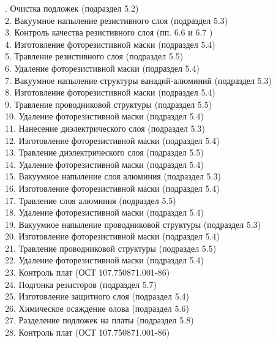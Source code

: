 \documentclass{bmstu}
\begin{document}
. Очистка подложек (подраздел 5.2) \\
	2. Вакуумное напыление резистивного слоя (подраздел 5.3) \\
	3. Контроль качества резистивного слоя (пп. 6.6 и 6.7 ) \\
	4. Изготовление фоторезистивной маски (подраздел 5.4) \\
	5. Травление резистивного слоя (подраздел 5.5) \\
	6. Удаление фоторезистивной маски (подраздел 5.4) \\
	7. Вакуумное напыление структуры ванадий-алюминий  (подраздел 5.3) \\
	8. Изготовление фоторезистивной маски (подраздел 5.4) \\
	9. Травление проводниковой структуры (подраздел 5.5) \\
	10. Удаление фоторезистивной маски (подраздел 5.4) \\
	11. Нанесение диэлектрического слоя (подраздел 5.3) \\
	12. Изготовление фоторезистивной маски (подраздел 5.4) \\
	13. Травление диэлектрического слоя (подраздел 5.5) \\
	14. Удаление фоторезистивной маски (подраздел 5.4) \\
	15. Вакуумное напыление слоя алюминия  (подраздел 5.3) \\
	16. Изготовление фоторезистивной маски (подраздел 5.4) \\
	17. Травление слоя алюминия (подраздел 5.5) \\
	18. Удаление фоторезистивной маски (подраздел 5.4) \\
	19. Вакуумное напыление проводниковой структуры (подраздел 5.3) \\
	20. Изготовление фоторезистивной маски (подраздел 5.4) \\
	21. Травление проводниковой структуры (подраздел 5.5) \\
	22. Удаление фоторезистивной маски (подраздел 5.4) \\
	23. Контроль плат (ОСТ 107.750871.001-86) \\
	24. Подгонка резисторов (подраздел 5.7) \\
	25. Изготовление защитного слоя (подраздел 5.4) \\
	26. Химическое осаждение олова (подраздел 5.6) \\
	27. Разделение подложек на платы (подраздел 5.8) \\
	28. Контроль плат (ОСТ 107.750871.001-86) \\
	
\end{document}
